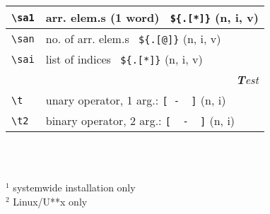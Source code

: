 \documentclass[oneside,11pt,a4paper,DIV18]{scrartcl}
\begin{document}
\begin{center}
\begin{tabular}[]{|p{11mm}|p{59mm}|}
\hline \verb'\sa1' & arr. elem.s (1 word) \ \verb'${.[*]}' \hfill (n, i, v)\\
\hline \verb'\san' & no. of arr. elem.s \ \verb'${.[@]}'   \hfill (n, i, v)\\
\hline \verb'\sai' & list of indices \ \verb'${.[*]}'      \hfill (n, i, v)\\
\hline
\hline
\multicolumn{2}{|r|}{\textsl{\textbf{T}est}}\\
\hline \verb'\t'   &  unary operator, 1 arg.: \verb'[ -  ]'         \hfill (n, i)\\
\hline \verb'\t2'  &  binary operator, 2 arg.: \verb'[  -  ]'        \hfill (n, i)\\
\hline
\end{tabular}\\
%
\begin{minipage}[b]{75mm}%
\scriptsize{%
\vspace{10mm}
\hrulefill\\
$^1$ {systemwide installation only}\\
$^2$ {Linux/U**x only}
}%
\end{minipage}\\
%


\end{center}
\end{document}

